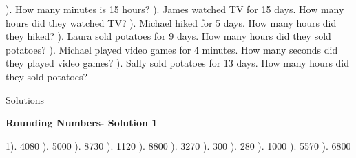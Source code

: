 \documentclass{article}%
\begin{document}
\newline%
\newline%
). How many minutes is 15 hours?%
\newline%
\newline%
). James watched TV for 15 days. How many hours did they watched TV?%
\newline%
\newline%
). Michael hiked for 5 days. How many hours did they hiked?%
\newline%
\newline%
). Laura sold potatoes for 9 days. How many hours did they sold potatoes?%
\newline%
\newline%
). Michael played video games for 4 minutes. How many seconds did they played video games?%
\newline%
\newline%
). Sally sold potatoes for 13 days. How many hours did they sold potatoes?%
\newline%
\newline%
\newline%
\pagebreak%
\huge%
\vspace*{\fill}%
\begin{center}%
Solutions%
\end{center}%
\vspace*{\fill}%
\normalsize%
\pagebreak%
\large%
\begin{center}%
\textbf{Rounding Numbers- Solution 1}%
\newline%
\end{center} \normalsize%
1). 4080%
). 5000%
). 8730%
). 1120%
). 8800%
). 3270%
). 300%
). 280%
). 1000%
). 5570%
). 6800%
\newline%
\end{document}
